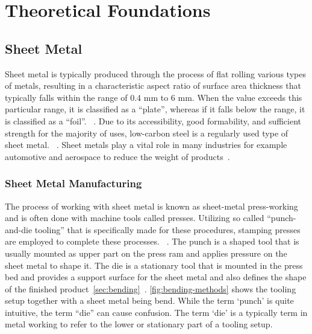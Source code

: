 \chapter{Theoretical Foundations}\label{ch:theoretical-foundations}


\section{Sheet Metal}\label{sec:sheet-metal}
Sheet metal is typically produced through the process of flat rolling various types of metals, resulting in a
characteristic aspect ratio of surface area thickness that typically falls within the range of 0.4 mm to 6 mm.
When the value exceeds this particular range, it is classified as a ``plate'', whereas if it falls below the range,
it is classified as a ``foil''.
~\cite[p. 405]{groover_fundamentalsmodernmanufacturing_2020}.
Due to its accessibility, good formability, and sufficient strength for the majority of uses, low-carbon steel is a
regularly used type of sheet metal.
~\cite[p. 405]{groover_fundamentalsmodernmanufacturing_2020}.
Sheet metals play a vital role in many industries for example automotive and aerospace to reduce the weight of
products~\cite[p. 1]{zheng_reviewformingtechniques_2018}.

\subsection{Sheet Metal Manufacturing}\label{subsec:sheet-metal-manufacturing}
The process of working with sheet metal is known as sheet-metal press-working and is often done with machine tools
called presses.
Utilizing so called ``punch-and-die tooling'' that is specifically made for these procedures, stamping presses are
employed to complete these processes.
~\cite[p. 405]{groover_fundamentalsmodernmanufacturing_2020}.
The punch is a shaped tool that is usually mounted as upper part on the press ram and applies
pressure on the sheet metal to shape it.
The die is a stationary tool that is mounted in the press bed and provides a support surface for
the sheet metal and also defines the shape of the finished
product~\cref{sec:bending}~\cite[p. 412]{groover_fundamentalsmodernmanufacturing_2020}.
\cref{fig:bending-methods} shows the tooling setup together with a sheet metal being bend.
While the term `punch' is quite intuitive, the term ``die'' can cause confusion.
The term `die' is a typically term in metal working to refer to the lower or stationary part of a tooling setup.

